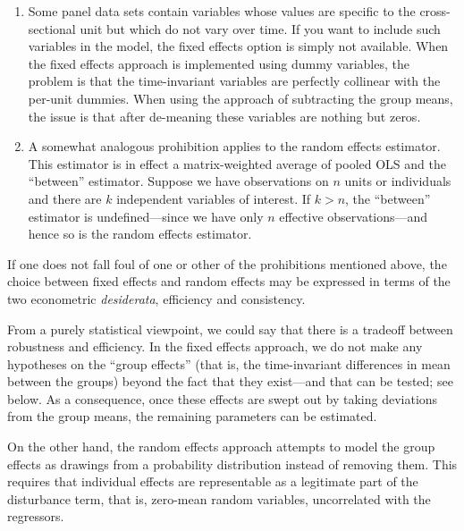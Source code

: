 \begin{enumerate}

\item Some panel data sets contain variables whose values are specific
  to the cross-sectional unit but which do not vary over time.  If you
  want to include such variables in the model, the fixed effects
  option is simply not available.  When the fixed effects approach is
  implemented using dummy variables, the problem is that the
  time-invariant variables are perfectly collinear with the per-unit
  dummies.  When using the approach of subtracting the group means,
  the issue is that after de-meaning these variables are nothing but
  zeros.
\item A somewhat analogous prohibition applies to the random effects
  estimator.  This estimator is in effect a matrix-weighted average of
  pooled OLS and the ``between'' estimator.  Suppose we have
  observations on $n$ units or individuals and there are $k$
  independent variables of interest.  If $k>n$, the ``between''
  estimator is undefined---since we have only $n$ effective
  observations---and hence so is the random effects estimator.
\end{enumerate}

If one does not fall foul of one or other of the prohibitions
mentioned above, the choice between fixed effects and random effects
may be expressed in terms of the two econometric \textit{desiderata},
efficiency and consistency.  

From a purely statistical viewpoint, we could say that there is a
tradeoff between robustness and efficiency. In the fixed effects
approach, we do not make any hypotheses on the ``group effects'' (that
is, the time-invariant differences in mean between the groups) beyond
the fact that they exist---and that can be tested; see below. As a
consequence, once these effects are swept out by taking deviations
from the group means, the remaining parameters can be estimated.

On the other hand, the random effects approach attempts to model the
group effects as drawings from a probability distribution instead of
removing them. This requires that individual effects are representable
as a legitimate part of the disturbance term, that is, zero-mean
random variables, uncorrelated with the regressors.

